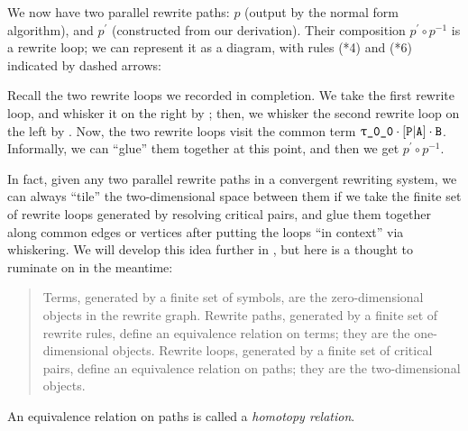 \documentclass[../generics]{subfiles}
\begin{document}
\begin{example}
We now have two parallel rewrite paths: $p$ (output by the normal form algorithm), and $p^\prime$ (constructed from our derivation). Their composition $p^\prime\circ p^{-1}$ is a rewrite loop; we can represent it as a diagram, with rules (*4) and (*6) indicated by dashed arrows:
\begin{center}
\end{center}
Recall the two rewrite loops we recorded in completion. We take the first rewrite loop, and whisker it on the right by \nB; then, we whisker the second rewrite loop on the left by \rT. Now, the two rewrite loops visit the common term $\rT\cdot\aPA\cdot\nB$. Informally, we can ``glue'' them together at this point, and then we get $p^\prime\circ p^{-1}$.

In fact, given any two parallel rewrite paths in a convergent rewriting system, we can always ``tile'' the two-dimensional space between them if we take the finite set of rewrite loops generated by resolving critical pairs, and glue them together along common edges or vertices after putting the loops ``in context'' via whiskering. We will develop this idea further in , but here is a thought to ruminate on in the meantime:
\begin{quote}
Terms, generated by a finite set of symbols, are the zero-dimensional objects in the rewrite graph. Rewrite paths, generated by a finite set of rewrite rules, define an equivalence relation on terms; they are the one-dimensional objects. Rewrite loops, generated by a finite set of critical pairs, define an equivalence relation on paths; they are the two-dimensional objects.
\end{quote}
An equivalence relation on paths is called a \emph{homotopy relation}.
\end{example}
\end{document}
